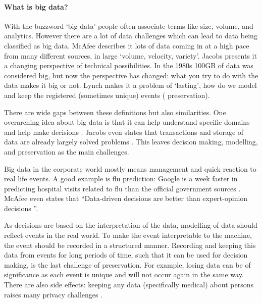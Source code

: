\paragraph{What is big data?}
With the buzzword `big data' people often associate terms like size, volume, and analytics.
However there are a lot of data challenges which can lead to data being classified as big data.
McAfee \cite{dsb1mcafee} describes it lots of data coming in at a high pace from many different sources, in large `volume, velocity, variety'.
Jacobs \cite{dsb5jacobs} presents it a changing perspective of technical possibilities.
In the 1980s 100GB of data was considered big, but now the perspective has changed: what you try to do with the data makes it big or not.
Lynch \cite{dsb3lynch} makes it a problem of `lasting', how do we model and keep the registered (sometimes unique) events (\ie{} preservation).

There are wide gaps between these definitions but also similarities.
One overarching idea about big data is that it can help understand specific domains and help make decisions \cite{dsb2lohr}.
Jacobs even states that transactions and storage of data are already largely solved problems \cite{dsb5jacobs}.
This leaves decision making, modelling, and preservation as the main challenges.

Big data in the corporate world mostly means management and quick reaction to real life events.
A good example is flu prediction: Google is a week faster in predicting hospital visits related to flu than the official government sources \cite{dsb8dugas, dsb1mcafee}.
McAfee even states that ``Data-driven decisions are better than expert-opinion decisions \cite{dsb1mcafee}''.

As decisions are based on the interpretation of the data, modelling of data should reflect events in the real world.
To make the event interpretable to the machine, the event should be recorded in a structured manner.
Recording and keeping this data from events for long periods of time, such that it can be used for decision making, is the last challenge of preservation.
For example, losing data can be of significance as each event is unique and will not occur again in the same way.
There are also side effects: keeping any data (specifically medical) about persons raises many privacy challenges \cite{dsb1mcafee}.

